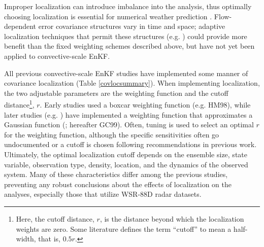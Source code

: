 Improper localization can introduce imbalance into the analysis, thus optimally choosing localization is essential for numerical weather prediction \citep{greybushetal11}. Flow-dependent error covariance structures vary in time and space; adaptive localization techniques that permit these structures (e.g. \citealt{bishophodyss09a,bishophodyss09b}) could provide more benefit than the fixed weighting schemes described above, but have not yet been applied to convective-scale EnKF.

All previous convective-scale EnKF studies have implemented some manner of covariance localization (Table \ref{covlocsummary}). When implementing localization, the two adjustable parameters are the weighting function and the cutoff distance\footnote{Here, the cutoff distance, \(r\), is the distance beyond which the localization weights are zero. Some literature defines the term “cutoff” to mean a half-width, that is, \(0.5r\).}, \( r \). Early studies used a boxcar weighting function (e.g. HM98), while later studies (e.g. \citealt{houtekamermitchell01}) have implemented a weighting function that approximates a Gaussian function (\citealt{gasparicohn99}; hereafter GC99). Often, tuning is used to select an optimal \( r \) for the weighting function, although the specific sensitivities often go undocumented or a cutoff is chosen following recommendations in previous work. Ultimately, the optimal localization cutoff depends on the ensemble size, state variable, observation type, density, location, and the dynamics of the observed system. Many of these characteristics differ among the previous studies, preventing any robust conclusions about the effects of localization on the analyses, especially those that utilize WSR-88D radar datasets.

